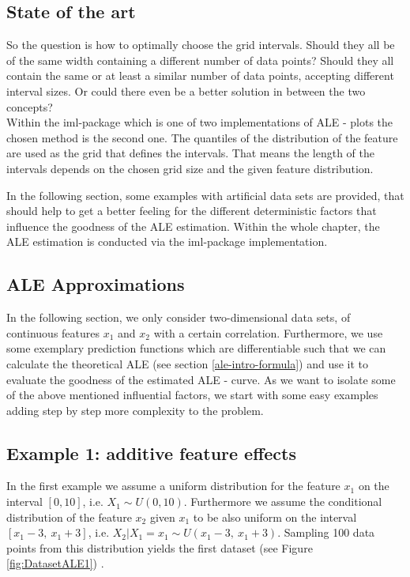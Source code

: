 \documentclass[]{krantz}
\begin{document}
\subsection{State of the art}\label{state-of-the-art}

So the question is how to optimally choose the grid intervals. Should
they all be of the same width containing a different number of data
points? Should they all contain the same or at least a similar number of
data points, accepting different interval sizes. Or could there even be
a better solution in between the two concepts?\\
Within the iml-package which is one of two implementations of ALE -
plots the chosen method is the second one. The quantiles of the
distribution of the feature are used as the grid that defines the
intervals. That means the length of the intervals depends on the chosen
grid size and the given feature distribution.

In the following section, some examples with artificial data sets are
provided, that should help to get a better feeling for the different
deterministic factors that influence the goodness of the ALE estimation.
Within the whole chapter, the ALE estimation is conducted via the
iml-package implementation.

\subsection{ALE Approximations}\label{ale-approximations}

In the following section, we only consider two-dimensional data sets, of
continuous features \(x_1\) and \(x_2\) with a certain correlation.
Furthermore, we use some exemplary prediction functions which are
differentiable such that we can calculate the theoretical ALE (see
section \ref{ale-intro-formula}) and use it to evaluate the goodness of
the estimated ALE - curve. As we want to isolate some of the above
mentioned influential factors, we start with some easy examples adding
step by step more complexity to the problem.

\subsection{Example 1: additive feature
effects}\label{example-1-additive-feature-effects}

In the first example we assume a uniform distribution for the feature
\(x_1\) on the interval \([0, 10]\), i.e. \(X_1 \sim U(0,10)\).
Furthermore we assume the conditional distribution of the feature
\(x_2\) given \(x_1\) to be also uniform on the interval
\([x_1 - 3,~x_1 + 3 ]\), i.e.
\(X_2 \vert X_1 = x_1 \sim U(x_1 - 3,~x_1 + 3 )\). Sampling 100 data
points from this distribution yields the first dataset (see Figure
\ref{fig:DatasetALE1}) .
\end{document}

